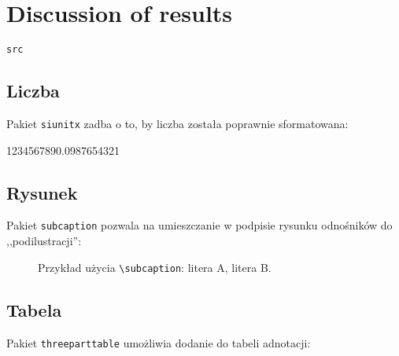 \chapter{Discussion of results}



\begin{lstlisting}
src
\end{lstlisting}


\section{Liczba}

Pakiet \texttt{siunitx} zadba o to, by liczba została poprawnie sformatowana: \\
\begin{center}
	\num{1234567890.0987654321}
\end{center}


\section{Rysunek}

Pakiet \texttt{subcaption} pozwala na umieszczanie w podpisie rysunku odnośników do ,,podilustracji'': \\

\begin{figure}[h]
	\centering
	\begin{subfigure}{0.35\textwidth}
		\centering
		\subcaption{\label{subfigure_a}}
	\end{subfigure}
	\begin{subfigure}{0.35\textwidth}
		\centering
		\subcaption{\label{subfigure_b}}
	\end{subfigure}
	
	\caption{\label{fig:subcaption_example}Przykład użycia \texttt{\textbackslash subcaption}: \protect{} litera A, \protect{} litera B.}
\end{figure}

\section{Tabela}

Pakiet \texttt{threeparttable} umożliwia dodanie do tabeli adnotacji: \\

